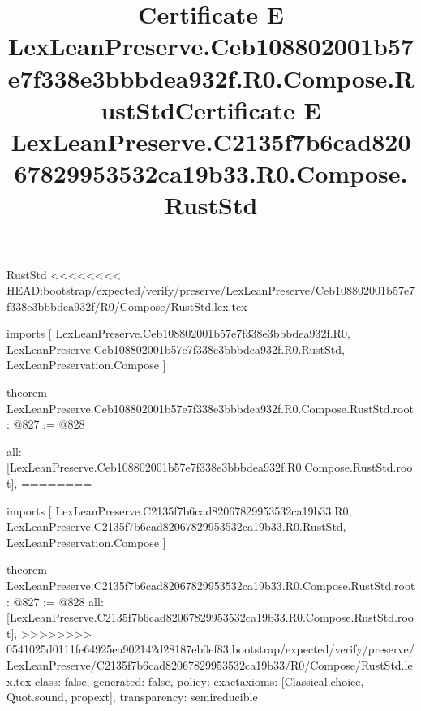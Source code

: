 \begin{lexlean}{RustStd}
<<<<<<<< HEAD:bootstrap/expected/verify/preserve/LexLeanPreserve/Ceb108802001b57e7f338e3bbbdea932f/R0/Compose/RustStd.lex.tex
\title{Certificate E LexLeanPreserve.Ceb108802001b57e7f338e3bbbdea932f.R0.Compose.RustStd}
\begin{coremodule}
imports [
  LexLeanPreserve.Ceb108802001b57e7f338e3bbbdea932f.R0,
  LexLeanPreserve.Ceb108802001b57e7f338e3bbbdea932f.R0.RustStd,
  LexLeanPreservation.Compose
]

theorem LexLeanPreserve.Ceb108802001b57e7f338e3bbbdea932f.R0.Compose.RustStd.root : @827 := @828 {
  all: [LexLeanPreserve.Ceb108802001b57e7f338e3bbbdea932f.R0.Compose.RustStd.root],
========
\title{Certificate E LexLeanPreserve.C2135f7b6cad82067829953532ca19b33.R0.Compose.RustStd}
\begin{coremodule}
imports [
  LexLeanPreserve.C2135f7b6cad82067829953532ca19b33.R0,
  LexLeanPreserve.C2135f7b6cad82067829953532ca19b33.R0.RustStd,
  LexLeanPreservation.Compose
]

theorem LexLeanPreserve.C2135f7b6cad82067829953532ca19b33.R0.Compose.RustStd.root : @827 := @828 {
  all: [LexLeanPreserve.C2135f7b6cad82067829953532ca19b33.R0.Compose.RustStd.root],
>>>>>>>> 0541025d0111fe64925ea902142d28187eb0ef83:bootstrap/expected/verify/preserve/LexLeanPreserve/C2135f7b6cad82067829953532ca19b33/R0/Compose/RustStd.lex.tex
  class: false,
  generated: false,
  policy: exact{axioms: [Classical.choice, Quot.sound, propext]},
  transparency: semireducible
}


\end{coremodule}}
\end{coremodule}
\end{lexlean}
